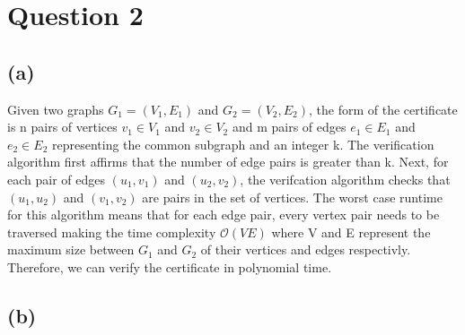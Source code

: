 \section{Question 2}
\subsection{(a)}
Given two graphs $G_1 = (V_1, E_1)$ and $G_2 = (V_2, E_2)$, the form of the certificate is 
n pairs of vertices $v_1 \in V_1$ and $v_2 \in V_2$ and m pairs of edges $e_1 \in E_1$ and $e_2 \in E_2$ representing the common subgraph and an integer k.
The verification algorithm first affirms that the number of edge pairs is greater than k.
Next, for each pair of edges $(u_1, v_1)$ and $(u_2, v_2)$, the verifcation algorithm checks that $(u_1, u_2)$ and $(v_1, v_2)$ are pairs in the set of vertices.
The worst case runtime for this algorithm means that for each edge pair, every vertex pair needs to be traversed making the time complexity $\mathcal{O}(VE)$
where V and E represent the maximum size between $G_1$ and $G_2$ of their vertices and edges respectivly.
Therefore, we can verify the certificate in polynomial time.
\subsection{(b)}